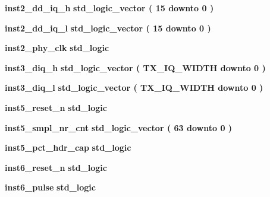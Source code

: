 \begin{DoxyCompactItemize}
\item 
{\bf inst2\+\_\+dd\+\_\+iq\+\_\+h} {\bfseries \textcolor{comment}{std\+\_\+logic\+\_\+vector}\textcolor{vhdlchar}{ }\textcolor{vhdlchar}{(}\textcolor{vhdlchar}{ }\textcolor{vhdlchar}{ } \textcolor{vhdldigit}{15} \textcolor{vhdlchar}{ }\textcolor{keywordflow}{downto}\textcolor{vhdlchar}{ }\textcolor{vhdlchar}{ } \textcolor{vhdldigit}{0} \textcolor{vhdlchar}{ }\textcolor{vhdlchar}{)}\textcolor{vhdlchar}{ }} 
\item 
{\bf inst2\+\_\+dd\+\_\+iq\+\_\+l} {\bfseries \textcolor{comment}{std\+\_\+logic\+\_\+vector}\textcolor{vhdlchar}{ }\textcolor{vhdlchar}{(}\textcolor{vhdlchar}{ }\textcolor{vhdlchar}{ } \textcolor{vhdldigit}{15} \textcolor{vhdlchar}{ }\textcolor{keywordflow}{downto}\textcolor{vhdlchar}{ }\textcolor{vhdlchar}{ } \textcolor{vhdldigit}{0} \textcolor{vhdlchar}{ }\textcolor{vhdlchar}{)}\textcolor{vhdlchar}{ }} 
\item 
{\bf inst2\+\_\+phy\+\_\+clk} {\bfseries \textcolor{comment}{std\+\_\+logic}\textcolor{vhdlchar}{ }} 
\item 
{\bf inst3\+\_\+diq\+\_\+h} {\bfseries \textcolor{comment}{std\+\_\+logic\+\_\+vector}\textcolor{vhdlchar}{ }\textcolor{vhdlchar}{(}\textcolor{vhdlchar}{ }\textcolor{vhdlchar}{ }\textcolor{vhdlchar}{ }\textcolor{vhdlchar}{ }{\bfseries {\bf T\+X\+\_\+\+I\+Q\+\_\+\+W\+I\+D\+TH}} \textcolor{vhdlchar}{ }\textcolor{keywordflow}{downto}\textcolor{vhdlchar}{ }\textcolor{vhdlchar}{ } \textcolor{vhdldigit}{0} \textcolor{vhdlchar}{ }\textcolor{vhdlchar}{)}\textcolor{vhdlchar}{ }} 
\item 
{\bf inst3\+\_\+diq\+\_\+l} {\bfseries \textcolor{comment}{std\+\_\+logic\+\_\+vector}\textcolor{vhdlchar}{ }\textcolor{vhdlchar}{(}\textcolor{vhdlchar}{ }\textcolor{vhdlchar}{ }\textcolor{vhdlchar}{ }\textcolor{vhdlchar}{ }{\bfseries {\bf T\+X\+\_\+\+I\+Q\+\_\+\+W\+I\+D\+TH}} \textcolor{vhdlchar}{ }\textcolor{keywordflow}{downto}\textcolor{vhdlchar}{ }\textcolor{vhdlchar}{ } \textcolor{vhdldigit}{0} \textcolor{vhdlchar}{ }\textcolor{vhdlchar}{)}\textcolor{vhdlchar}{ }} 
\item 
{\bf inst5\+\_\+reset\+\_\+n} {\bfseries \textcolor{comment}{std\+\_\+logic}\textcolor{vhdlchar}{ }} 
\item 
{\bf inst5\+\_\+smpl\+\_\+nr\+\_\+cnt} {\bfseries \textcolor{comment}{std\+\_\+logic\+\_\+vector}\textcolor{vhdlchar}{ }\textcolor{vhdlchar}{(}\textcolor{vhdlchar}{ }\textcolor{vhdlchar}{ } \textcolor{vhdldigit}{63} \textcolor{vhdlchar}{ }\textcolor{keywordflow}{downto}\textcolor{vhdlchar}{ }\textcolor{vhdlchar}{ } \textcolor{vhdldigit}{0} \textcolor{vhdlchar}{ }\textcolor{vhdlchar}{)}\textcolor{vhdlchar}{ }} 
\item 
{\bf inst5\+\_\+pct\+\_\+hdr\+\_\+cap} {\bfseries \textcolor{comment}{std\+\_\+logic}\textcolor{vhdlchar}{ }} 
\item 
{\bf inst6\+\_\+reset\+\_\+n} {\bfseries \textcolor{comment}{std\+\_\+logic}\textcolor{vhdlchar}{ }} 
\item 
{\bf inst6\+\_\+pulse} {\bfseries \textcolor{comment}{std\+\_\+logic}\textcolor{vhdlchar}{ }} 
\end{DoxyCompactItemize}
